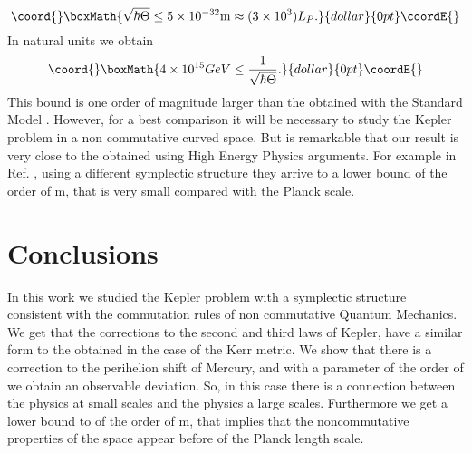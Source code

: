 \documentclass[a4paper,12pt]{article}
\begin{document}
$$\coord{}\boxMath{\sqrt {\hbar \Theta }\leq 5 \times 10^{-32}{\text m} \approx (3\times 10^{3}) L_{P}.}{dollar}{0pt}\coordE{}$$
In natural units we obtain
$$\coord{}\boxMath{
4\times 10^{15} GeV \leq \frac{1}{\sqrt {\hbar \Theta }}.}{dollar}{0pt}\coordE{}$$ This
bound is one order of magnitude larger than the obtained with the
Standard Model \cite{chaichian:gnus}. However, for a best
comparison it will be necessary to study  the Kepler problem in a
non commutative curved space. But is remarkable that our result is
very close to the obtained using High Energy Physics arguments.
For example in Ref. \cite{minic:gnus}, using a different
symplectic structure they arrive to a lower bound of the order of
\coordHE{} m,
 that is very small compared with the Planck scale.\\



\section{Conclusions}
In this work we studied the Kepler problem with a symplectic
structure consistent with the commutation rules of non commutative
Quantum Mechanics. We get that the corrections to the second and
third laws of Kepler, have a similar form to the obtained in the
case of the Kerr metric. We show that there is a correction to the
perihelion shift of Mercury, and  with a \myHighlight{$\hbar\Theta$}\coordHE{} parameter
of the order of  \coordHE{} we obtain an observable
deviation. So, in this case there is a connection between the
physics at small scales and the physics a large scales.
Furthermore we get a lower bound to \myHighlight{$\sqrt{\hbar\Theta}$}\coordHE{} of the
order of \coordHE{}m, that implies that the noncommutative
properties of the space appear before of the Planck length scale.
\end{document}
